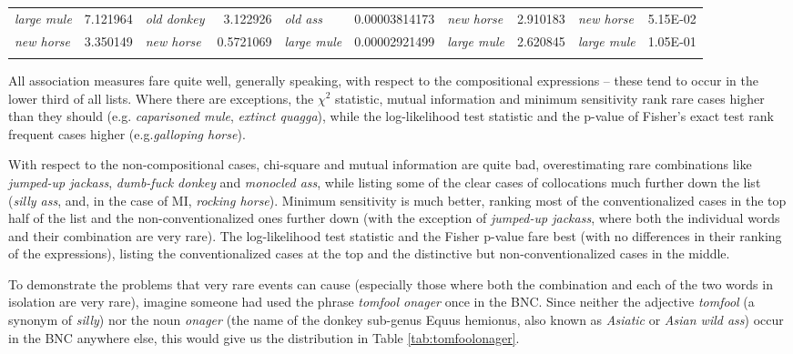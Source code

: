 \begin{sidewaystable}[!htbp]
{\begin{tabular}[t]{lr|lr|lr|lr|lr}
\textit{large mule} & \num{7.121964} & \textit{old donkey} & \num{3.122926} & \textit{old ass} & \num[round-mode=places,round-precision=6]{0.00003814173} & \textit{new horse} & \num{2.910183} & \textit{new horse} & 5.15E-02 \\
\textit{new horse} & \num{3.350149} & \textit{new horse} & \num{0.5721069} & \textit{large mule} & \num[round-mode=places,round-precision=6]{0.00002921499} & \textit{large mule} & \num{2.620845} & \textit{large mule} & 1.05E-01 \\
\lspbottomrule
\end{tabular}}
\end{sidewaystable}

All association measures fare quite well, generally speaking, with respect to the compositional expressions -- these tend to occur in the lower third of all lists. Where there are exceptions, the $\chi^2$ statistic, mutual information and minimum sensitivity rank rare cases higher than they should (e.g. \textit{caparisoned mule}, \textit{extinct quagga}), while the log-likelihood test statistic and the p-value of Fisher's exact test rank frequent cases higher (e.g.\textit{galloping horse}).

With respect to the non-compositional cases, chi-square and mutual information are quite bad, overestimating rare combinations like \textit{jumped-up jackass}, \textit{dumb-fuck donkey} and \textit{monocled ass}, while listing some of the clear cases of collocations much further down the list (\textit{silly ass}, and, in the case of MI, \textit{rocking horse}). Minimum sensitivity is much better, ranking most of the conventionalized cases in the top half of the list and the non-conventionalized ones further down (with the exception of \textit{jumped-up jackass}, where both the individual words and their combination are very rare). The log-likelihood test statistic and the Fisher p-value fare best (with no differences in their ranking of the expressions), listing the conventionalized cases at the top and the distinctive but non-conventionalized cases in the middle.

To demonstrate the problems that very rare events can cause (especially those where both the combination and each of the two words in isolation are very rare), imagine someone had used the phrase \textit{tomfool onager} once in the BNC. Since neither the adjective \textit{tomfool} (a synonym of \textit{silly}) nor the noun \textit{onager} (the name of the donkey sub-genus Equus hemionus, also known as \textit{Asiatic} or \textit{Asian wild ass}) occur in the BNC anywhere else, this would give us the distribution in Table \ref{tab:tomfoolonager}.

